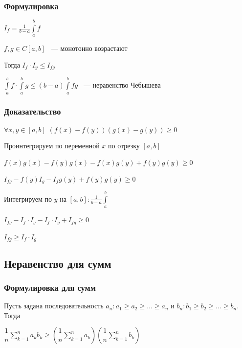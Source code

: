 \documentclass{article}
\begin{document}
            \subsubsection{Формулировка}
		
                $I_f = \frac{1}{b - a} \int\limits^b_a f$
		
                $f, g \in C[a, b]$ ~--- монотонно возрастают
			
                Тогда $I_f \cdot I_y \leq I_{fg}$
		
                $\int\limits^b_a f \cdot \int\limits^b_a g \leq (b - a) \int\limits^b_a fg$ ~--- неравенство Чебышева
		
            \subsubsection{Доказательство}
		
                $\forall x, y \in [a, b]$ $(f(x) - f(y))(g(x)-g(y)) \geq 0$
			
                Проинтегрируем по переменной $x$ по отрезку $[a, b]$
			
                $f(x)g(x) - f(y)g(x) - f(x)g(y) + f(y)g(y) \geq 0$
			
                $I_{fg} - f(y)I_g - I_f g(y) + f(y)g(y) \geq 0$
			
                Интегрируем по $y$ на $[a, b] : \frac{1}{b - a} \int\limits^b_a$
			
                $I_{fg} - I_f \cdot I_g - I_f \cdot I_g + I_{fg} \geq 0$
			
                $I_{fg} \geq I_f \cdot I_g$
                
        \subsection{Неравенство для сумм}
        
            \subsubsection{Формулировка для сумм}
            
                Пусть задана последовательность $a_n : a_1 \geq a_2 \geq \ldots \geq a_n$ и $b_n : b_1 \geq b_2 \geq \ldots \geq b_n$. Тогда
                
                $\dfrac{1}{n} \sum\limits^n_{k = 1} a_k b_k \geq \left( \dfrac{1}{n} \sum\limits^n_{k = 1} a_k \right) \left( \dfrac{1}{n} \sum\limits^n_{k = 1} b_k \right)$
                
\end{document}
